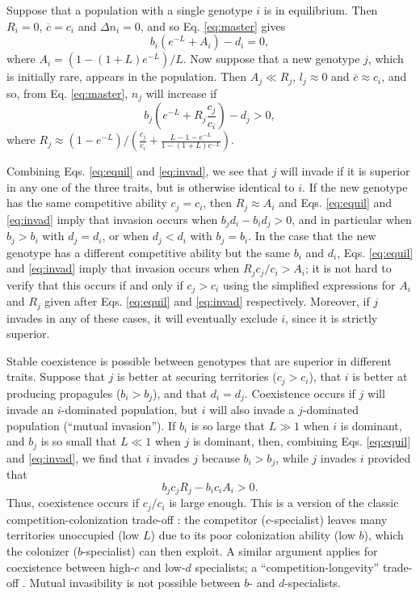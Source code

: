 \documentclass[11pt]{article}
\begin{document}
Suppose that a population with a single genotype $i$ is in equilibrium. Then $R_i=0$, $\overline{c}=c_i$ and $\Delta n_i = 0$, and so Eq. \eqref{eq:master} gives
\begin{equation}
b_i\left(e^{-L}+A_i\right)-d_i=0,\label{eq:equil}
\end{equation}
where $A_i=(1-(1+L)e^{-L})/L$. Now suppose that a new genotype $j$, which is initially rare, appears in the population. Then $A_j\ll R_j$, $l_j\approx 0$ and $\overline{c}\approx c_i$, and so, from Eq. \eqref{eq:master}, $n_j$ will increase if 
\begin{equation}
b_j \left(e^{-L}+R_j\frac{c_j}{c_i}\right)-d_j>0,\label{eq:invad}
\end{equation}
where $R_j\approx (1-e^{-L})/\left(\frac{c_j}{c_i}+\frac{L-1-e^{-L}}{1-(1+L)e^{-L}}\right)$. 

Combining Eqs. \eqref{eq:equil} and \eqref{eq:invad}, we see that $j$ will invade if it is superior in any one of the three traits, but is otherwise identical to $i$. If the new genotype has the same competitive ability $c_j=c_i$, then $R_j\approx A_i$ and Eqs. \eqref{eq:equil} and \eqref{eq:invad} imply that invasion occurs when $b_jd_i-b_id_j>0$, and in particular when $b_j>b_i$ with $d_j=d_i$, or when $d_j<d_i$ with $b_j=b_i$. In the case that the new genotype has a different competitive ability but the same $b_i$ and $d_i$, Eqs. \eqref{eq:equil} and \eqref{eq:invad} imply that invasion occurs when $R_j c_j/c_i > A_i$; it is not hard to verify that this occurs if and only if $c_j>c_i$ using the simplified expressions for $A_i$ and $R_j$ given after Eqs. \eqref{eq:equil} and \eqref{eq:invad} respectively. Moreover, if $j$ invades in any of these cases, it will eventually exclude $i$, since it is strictly superior. 

Stable coexistence is possible between genotypes that are superior in different traits. Suppose that $j$ is better at securing territories ($c_j>c_i$), that $i$ is better at producing propagules ($b_i>b_j$), and that $d_i=d_j$. Coexistence occurs if $j$ will invade an $i$-dominated population, but $i$ will also invade a $j$-dominated population (``mutual invasion''). If $b_i$ is so large that $L\gg 1$ when $i$ is dominant, and $b_j$ is so small that $L\ll 1$ when $j$ is dominant, then, combining Eqs. \eqref{eq:equil} and \eqref{eq:invad}, we find that $i$ invades $j$ because $b_i>b_j$, while $j$ invades $i$ provided that
\begin{equation}
b_jc_jR_j-b_i c_i A_i>0. \label{eq:jinvadcoex}
\end{equation}
Thus, coexistence occurs if $c_j/c_i$ is large enough. This is a version of the classic competition-colonization trade-off \citep{tilman_94,levins_71}: the competitor ($c$-specialist) leaves many territories unoccupied (low $L$) due to its poor colonization ability (low $b$), which the colonizer ($b$-specialist) can then exploit. A similar argument applies for coexistence between high-$c$ and low-$d$ specialists; a ``competition-longevity'' trade-off \citep{tilman_94}. Mutual invasibility is not possible between $b$- and $d$-specialists. 
\end{document}
